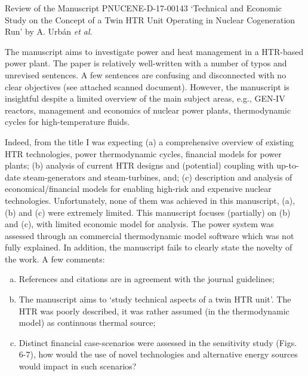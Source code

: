 \documentclass[14pt,twoside]{report}
\begin{document}
\afterpage{%
    \clearpage%
    \thispagestyle{empty}%
    \begin{landscape}%
        \centering %
        \vfill
    \end{landscape}
    \clearpage%
}
\vfill 
\clearpage


\begin{center}
  {\Large Review of the Manuscript PNUCENE-D-17-00143 `Technical and Economic Study on the Concept of a Twin HTR Unit Operating in Nuclear Cogeneration Run' by A. Urb\'an {\it et al.}}
\end{center}

\medskip
The manuscript aims to investigate power and heat management in a HTR-based power plant. The paper is relatively well-written with a number of typos and unrevised sentences. A few sentences are confusing and disconnected with no clear objectives (see attached scanned document).  However, the manuscript is insightful despite a limited overview of the main subject areas, e.g., GEN-IV reactors, management and economics of nuclear power plants, thermodynamic cycles for high-temperature fluids.

Indeed, from the title I was expecting (a) a comprehensive overview of existing HTR technologies, power thermodynamic cycles, financial models for power plants; (b) analysis of current HTR designs and (potential) coupling with up-to-date steam-generators and steam-turbines, and; (c) description and analysis of economical/financial models for enabling high-risk and expensive nuclear technologies. Unfortunately, none of them was achieved in this manuscript, (a), (b) and (c) were extremely limited. This manuscript focuses (partially) on (b) and (c), with limited economic model for analysis. The power system was assessed through an commercial thermodynamic model software which was not fully explained. In addition, the manuscript fails to clearly state the novelty of the work. A few comments:
\begin{enumerate}[(a)] 
%
    \item References and citations are in agreement with the journal guidelines;
    \item The manuscript aims to `study technical aspects of a twin HTR unit'. The HTR was poorly described, it was rather assumed (in the thermodynamic model) as continuous thermal source;
    \item Distinct financial case-scenarios were assessed in the sensitivity study (Figs. 6-7), how would the use of novel technologies and alternative energy sources would impact in such scenarios?
\end{enumerate}
\end{document}
